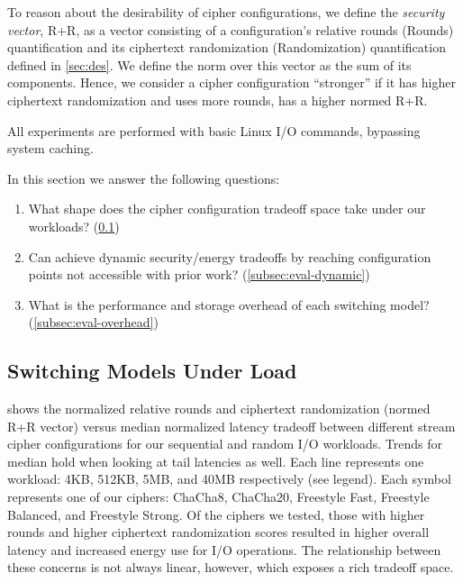 To reason about the desirability of cipher configurations, we define the {\em
security vector}, R+R, as a vector consisting of a configuration's relative
rounds (Rounds) quantification and its ciphertext randomization (Randomization)
quantification defined in \cref{sec:des}. We define the norm over this vector as
the sum of its components. Hence, we consider a cipher configuration
``stronger'' if it has higher ciphertext randomization and uses more rounds, \ie
has a higher normed R+R.

All experiments are performed with basic Linux I/O commands, bypassing system
caching.

In this section we answer the following questions:

\begin{enumerate}
  \item What shape does the cipher configuration tradeoff space take under our
  workloads? (\cref{subsec:eval-baseline})
  \item Can \sys achieve dynamic security/energy tradeoffs by reaching
  configuration points not accessible with prior work?
  (\cref{subsec:eval-dynamic})
  \item What is the performance and storage overhead of each switching model?
  (\cref{subsec:eval-overhead})
\end{enumerate}


\subsection{Switching Models Under Load}\label{subsec:eval-baseline}



 shows the normalized relative rounds and ciphertext
randomization (normed R+R vector) versus median normalized latency tradeoff
between different stream cipher configurations for our sequential and random I/O
workloads. Trends for median hold when looking at tail latencies as well. Each
line represents one workload: 4KB, 512KB, 5MB, and 40MB respectively (see
legend). Each symbol represents one of our ciphers: ChaCha8, ChaCha20, Freestyle
Fast, Freestyle Balanced, and Freestyle Strong. Of the ciphers we tested, those
with higher rounds and higher ciphertext randomization scores resulted in higher
overall latency and increased energy use for I/O operations. The relationship
between these concerns is not always linear, however, which exposes a rich
tradeoff space.

